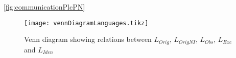 \autoref{fig:communicationPlcPN}

\usetikzlibrary{patterns}
\begin{figure}[H]
  \centering
  \texttt{[image: vennDiagramLanguages.tikz]}
  \caption{Venn diagram showing relations between $L_{Orig}$, $L_{OrigNI}$,
    $L_{Obs}$, $L_{Exc}$ and $L_{Iden}$}
\end{figure}


